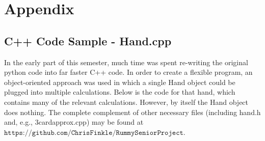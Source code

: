\documentclass[letter,12pt]{article}
\begin{document}
\section{Appendix}

\subsection{C++ Code Sample - Hand.cpp}

In the early part of this semester, much time was spent re-writing the original python code into far faster C++ code. In order to create a flexible program, an object-oriented approach was used in which a single Hand object could be plugged into multiple calculations. Below is the code for that hand, which contains many of the relevant calculations. However, by itself the Hand object does nothing. The complete complement of other necessary files (including hand.h and, e.g., 3cardapprox.cpp) may be found at $\texttt{https://github.com/ChrisFinkle/RummySeniorProject}$.
\end{document}
